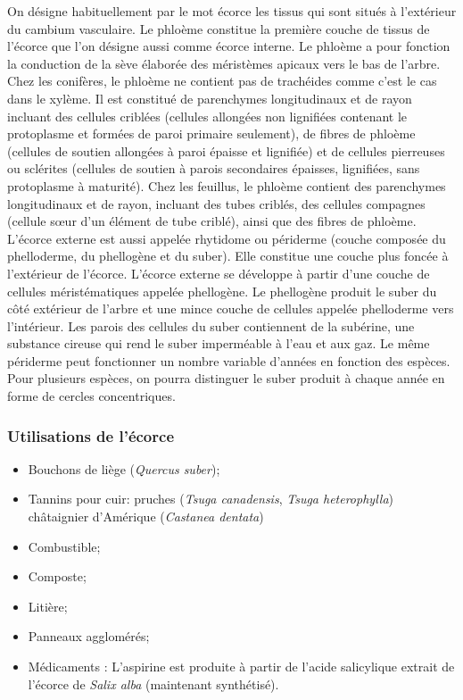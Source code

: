 On désigne habituellement par le mot écorce les tissus qui sont situés à l'extérieur du cambium vasculaire. Le phloème constitue la première couche de tissus de l'écorce que l'on désigne aussi comme écorce interne. Le phloème a pour fonction la conduction de la sève élaborée des méristèmes apicaux vers le bas de l'arbre. Chez les conifères, le phloème ne contient pas de trachéides comme c'est le cas dans le xylème. Il est constitué de parenchymes longitudinaux et de rayon incluant des cellules criblées (cellules allongées non lignifiées contenant le protoplasme et formées de paroi primaire seulement), de fibres de phloème (cellules de soutien allongées à paroi épaisse et lignifiée) et de cellules pierreuses ou sclérites (cellules de soutien à parois secondaires épaisses, lignifiées, sans protoplasme à maturité). Chez les feuillus, le phloème contient des parenchymes longitudinaux et de rayon, incluant des tubes criblés, des cellules compagnes (cellule sœur d'un élément de tube criblé), ainsi que des fibres de phloème.\\ 
 
L'écorce externe est aussi appelée rhytidome ou périderme (couche composée du phelloderme, du phellogène et du suber). Elle constitue une couche plus foncée à l'extérieur de l'écorce. L'écorce externe se développe à partir d'une couche de cellules méristématiques appelée phellogène. Le phellogène produit le suber du côté extérieur de l'arbre et une mince couche de cellules appelée phelloderme vers l'intérieur.  Les parois des cellules du suber contiennent de la subérine, une substance cireuse qui rend le suber imperméable à l'eau et aux gaz. Le même périderme peut fonctionner un nombre variable d'années en fonction des espèces. Pour plusieurs espèces, on pourra distinguer le suber produit à chaque année en forme de cercles concentriques.   

\subsubsection{Utilisations de l'écorce }

\begin{itemize}
\item Bouchons de liège (\textit{Quercus suber}); 
\item Tannins pour cuir: pruches (\textit{Tsuga canadensis}, \textit{Tsuga heterophylla})  châtaignier d'Amérique (\textit{Castanea dentata}) 
\item Combustible; 
\item Composte; 
\item Litière; 
\item Panneaux agglomérés; 
\item Médicaments : L'aspirine est produite à partir de l'acide salicylique extrait de l'écorce de \textit{Salix alba} (maintenant synthétisé). 
\end{itemize}
 
